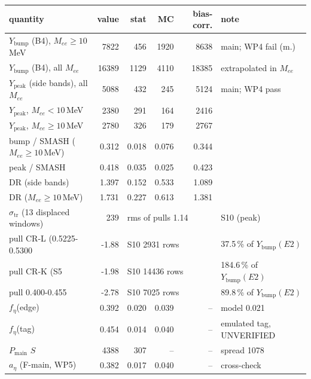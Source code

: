 \begin{tabular}{lrrrrl}
\toprule
quantity & value & stat & MC & bias-corr. & note \\
\midrule
$Y_\mathrm{bump}$ (B4), $M_{ee} \ge 10$\,MeV & 7822 & 456 & 1920 & 8638 & main; WP4 fail (m.) \\
$Y_\mathrm{bump}$ (B4), all $M_{ee}$ & 16389 & 1129 & 4110 & 18385 & extrapolated in $M_{ee}$ \\
$Y_\mathrm{peak}$ (side bands), all $M_{ee}$ & 5088 & 432 & 245 & 5124 & main; WP4 pass \\
$Y_\mathrm{peak}$, $M_{ee} < 10$\,MeV & 2380 & 291 & 164 & 2416 &  \\
$Y_\mathrm{peak}$, $M_{ee} \ge 10$\,MeV & 2780 & 326 & 179 & 2767 &  \\
bump / SMASH ($M_{ee} \ge 10$\,MeV) & 0.312 & 0.018 & 0.076 & 0.344 &  \\
peak / SMASH & 0.418 & 0.035 & 0.025 & 0.423 &  \\
DR (side bands) & 1.397 & 0.152 & 0.533 & 1.089 &  \\
DR ($M_{ee} \ge 10$\,MeV) & 1.731 & 0.227 & 0.613 & 1.381 &  \\
\midrule
$\sigma_\mathrm{tr}$ (13 displaced windows) & 239 & \multicolumn{3}{l}{rms of pulls 1.14} & S10 (peak) \\
pull CR-L (0.5225-0.5300 & -1.88 & \multicolumn{3}{l}{S10 2931 rows} & 37.5\,\% of $Y_\mathrm{bump}(E2)$ \\
pull CR-K (S5 & -1.98 & \multicolumn{3}{l}{S10 14436 rows} & 184.6\,\% of $Y_\mathrm{bump}(E2)$ \\
pull 0.400-0.455 & -2.78 & \multicolumn{3}{l}{S10 7025 rows} & 89.8\,\% of $Y_\mathrm{bump}(E2)$ \\
\midrule
$f_\eta$(edge) & 0.392 & 0.020 & 0.039 & -- & model 0.021 \\
$f_\eta$(tag) & 0.454 & 0.014 & 0.040 & -- & emulated tag, UNVERIFIED \\
$P_\mathrm{main}$ $S$ & 4388 & 307 & -- & -- & spread 1078 \\
$a_\eta$ (F-main, WP5) & 0.382 & 0.017 & 0.040 & -- & cross-check \\
\bottomrule
\end{tabular}
